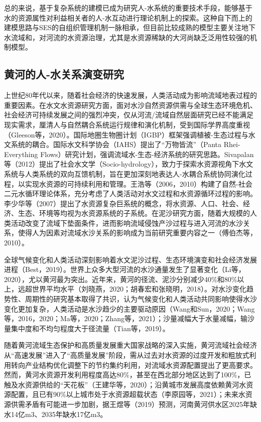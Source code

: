 总的来说，基于复杂系统的建模已成为研究人-水系统的重要技术手段，能够基于水的资源属性对利益相关者的人-水互动进行理论机制上的探索。这种自下而上的建模思路与SES的自组织管理机制一脉相承，但目前比较成熟的模型主要关注地下水流域和，对河流的水资源治理，尤其是水资源稀缺的大河尚缺乏泛用性较强的机制模型。

\subsection{黄河的人-水关系演变研究}

上世纪80年代以来，随着社会经济的快速发展，人类活动成为影响流域地表过程的重要因素。在水文水资源研究方面，面对水沙自然资源供需与全球生态环境危机、社会经济可持续发展之间的强烈冲突，仅从河流/流域自然层面研究已经不能满足现实需求，厘清人与自然耦合系统运行规律和演化机制，受到国际学界高度重视（Gleeson等，2020）。国际地圈生物圈计划（IGBP）框架强调植被-生态过程与水文系统的耦合。国际水文科学协会（IAHS）提出了“万物皆流”（Panta Rhei-Everything Flows）研究计划，强调流域水-生态-经济系统的研究思路。Sivapalan等（2012）提出了社会水文学（Socio-hydrology），致力于探索水资源视角下水文系统与人类系统的双向互馈机制，旨在更加深刻地表达人-水耦合系统协同演化过程，以实现水资源的可持续利用和管理。王浩等（2006，2010）构建了自然-社会二元水循环理论体系，充分考虑了人类活动对水文过程和水资源循环过程的影响。李少华等（2007）提出了水资源复杂巨系统的概念，将水资源、人口、社会、经济、生态、环境等均视为水资源系统的子系统。在泥沙研究方面，随着大规模的人类活动改变了流域下垫面条件，进而影响流域侵蚀产沙过程与进入河流的水沙关系，使得人为因素对流域水沙关系的影响成为当前研究重要内容之一（傅伯杰等，2010）。

全球气候变化和人类活动深刻影响着水文泥沙过程、生态环境演变和社会经济发展进程（Best，2019）。世界上众多大型河流的水沙通量发生了显著变化（Li等，2020），尤以黄河最为突出。近年来，黄河的径流、泥沙分别减少40\%和80\%以上，远超世界平均水平（刘晓燕，2020；胡春宏和张晓明，2018）。对水沙变化趋势性、周期性的研究基本取得了共识，认为气候变化和人类活动共同影响使得水沙变化更加复杂，人类活动是水沙趋少的主要驱动原因（Wang和Sun，2020；Wang等，2016，2020；Ma等，2020；Zhang等，2021）；沙量减幅大于水量减幅，输沙量集中度和不均匀程度大于径流量（Tian等，2019）。

随着黄河流域生态保护和高质量发展重大国家战略的深入实施，黄河流域社会经济从“高速发展”进入了“高质量发展”阶段，需从过去对水资源的过度开发和粗放式利用转向产业结构优化调整下的节约集约利用，对流域水资源配置提出了更高要求。然而，黄河水资源开发利用程度高达80\%，甚至在西北部分地区达到了100\%，已触及水资源供给的“天花板”（王建华等，2020）；沿黄城市发展高度依赖黄河水资源配置，且已有90\%以上城市处于水资源超载状态（李原园等，2021）；未来水资源供需矛盾有可能进一步加剧，据王煜等（2019）预测，河南黄河供水区2025年缺水14亿m3、2035年缺水17亿m3。
